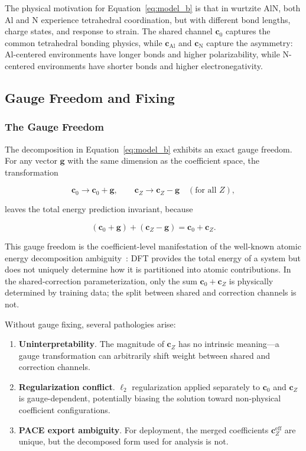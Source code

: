 \documentclass[twoside,prb,aps,floatfix,superscriptaddress,longbibliography]{revtex4-2}
\begin{document}
The physical motivation for Equation~\eqref{eq:model_b} is that in wurtzite AlN, both Al and N experience tetrahedral coordination, but with different bond lengths, charge states, and response to strain. The shared channel $\mathbf{c}_0$ captures the common tetrahedral bonding physics, while $\mathbf{c}_{\mathrm{Al}}$ and $\mathbf{c}_{\mathrm{N}}$ capture the asymmetry: Al-centered environments have longer bonds and higher polarizability, while N-centered environments have shorter bonds and higher electronegativity.

\subsection{Gauge Freedom and Fixing}
\label{sec:gauge}

\subsubsection{The Gauge Freedom}

The decomposition in Equation~\eqref{eq:model_b} exhibits an exact gauge freedom. For any vector $\mathbf{g}$ with the same dimension as the coefficient space, the transformation

\begin{equation}
\mathbf{c}_0 \to \mathbf{c}_0 + \mathbf{g},
\qquad
\mathbf{c}_Z \to \mathbf{c}_Z - \mathbf{g} \quad (\text{for all } Z),
\label{eq:gauge_transform}
\end{equation}

leaves the total energy prediction invariant, because

\begin{equation}
(\mathbf{c}_0 + \mathbf{g}) + (\mathbf{c}_Z - \mathbf{g}) = \mathbf{c}_0 + \mathbf{c}_Z.
\label{eq:gauge_invariance}
\end{equation}

This gauge freedom is the coefficient-level manifestation of the well-known atomic energy decomposition ambiguity~\cite{Yoo2019AtomicEnergyMapping}: DFT provides the total energy of a system but does not uniquely determine how it is partitioned into atomic contributions. In the shared-correction parameterization, only the sum $\mathbf{c}_0 + \mathbf{c}_Z$ is physically determined by training data; the split between shared and correction channels is not.

Without gauge fixing, several pathologies arise:
\begin{enumerate}[label=(\roman*)]
    \item \textbf{Uninterpretability}. The magnitude of $\mathbf{c}_Z$ has no intrinsic meaning---a gauge transformation can arbitrarily shift weight between shared and correction channels.
    \item \textbf{Regularization conflict}. $\ell_2$ regularization applied separately to $\mathbf{c}_0$ and $\mathbf{c}_Z$ is gauge-dependent, potentially biasing the solution toward non-physical coefficient configurations.
    \item \textbf{PACE export ambiguity}. For deployment, the merged coefficients $\mathbf{c}_Z^{\mathrm{eff}}$ are unique, but the decomposed form used for analysis is not.
\end{enumerate}
\end{document}
